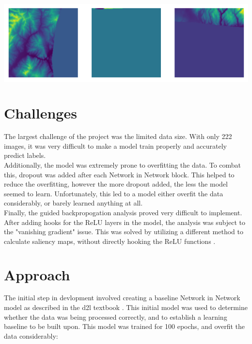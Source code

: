 \documentclass{article}[12pt]
\begin{document}
\begin{center}
    \includegraphics[width=1\textwidth]{images/low_data.png}
\end{center}

\section*{Challenges}

\indent
The largest challenge of the project was the limited data size. With only 222 images, it was very difficult to make a model train properly and accurately predict labels.\\
\indent
Additionally, the model was extremely prone to overfitting the data. To combat this, dropout was added after each Network in Network block. This helped to reduce the overfitting, however the more dropout added, the less the model seemed to learn. Unfortunately, this led to a model either overfit the data considerably, or barely learned anything at all.\\
\indent
Finally, the guided backpropogation analysis proved very difficult to implement. After adding hooks for the ReLU layers in the model, the analysis was subject to the "vanishing gradient" issue. This was solved by utilizing a different method to calculate saliency maps, without directly hooking the ReLU functions \cite{saliency}.\\



\section*{Approach}

\indent
The initial step in devlopment involved creating a baseline Network in Network model as described in the d2l textbook \cite{d2l}. This initial model was used to determine whether the data was being processed correctly, and to establish a learning baseline to be built upon. This model was trained for 100 epochs, and overfit the data considerably: \\
\end{document}
